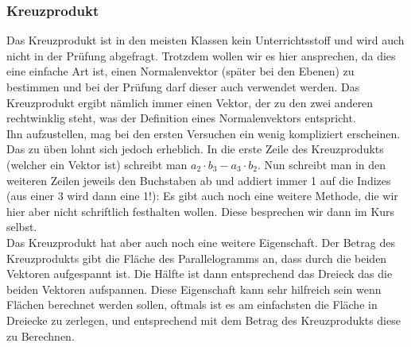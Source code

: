 	\subsubsection{Kreuzprodukt}
		Das Kreuzprodukt ist in den meisten Klassen kein Unterrichtsstoff und wird
		auch nicht in der Prüfung abgefragt. Trotzdem wollen wir es hier ansprechen,
		da dies eine einfache Art ist, einen Normalenvektor (später bei den Ebenen) zu
		bestimmen und bei der Prüfung darf dieser auch verwendet werden. Das
		Kreuzprodukt ergibt nämlich immer einen Vektor, der zu den zwei anderen
		rechtwinklig steht, was der Definition eines Normalenvektors entspricht.\\
		Ihn aufzustellen, mag bei den ersten Versuchen ein wenig kompliziert
		erscheinen. Das zu üben lohnt sich jedoch erheblich. In die erste Zeile des
		Kreuzprodukts (welcher ein Vektor ist) schreibt man \(a_2\cdot b_3-a_3\cdot
		b_2\). Nun schreibt man in den weiteren Zeilen jeweils den Buchstaben ab und
		addiert immer 1 auf die Indizes (aus einer 3 wird dann eine 1!):
		\formel{
			\[\vec{a} \times \vec{b}=
			\begin{pmatrix}
			 a_2b_3-a_3b_2\\
			 a_3b_1-a_1b_3\\
			 a_1b_2-a_2b_1
			\end{pmatrix}\]
		}
		Es gibt auch noch eine weitere Methode, die wir hier aber nicht schriftlich
		festhalten wollen. Diese besprechen wir dann im Kurs selbst.\\
		Das Kreuzprodukt hat aber auch noch eine weitere Eigenschaft. Der Betrag des
		Kreuzprodukts gibt die Fläche des Parallelogramms an, dass durch die beiden
		Vektoren aufgespannt ist. Die Hälfte ist dann entsprechend das Dreieck das die
		beiden Vektoren aufspannen. Diese Eigenschaft kann sehr hilfreich sein wenn
		Flächen berechnet werden sollen, oftmals ist es am einfachsten die Fläche in
		Dreiecke zu zerlegen, und entsprechend mit dem Betrag des Kreuzprodukts diese
		zu Berechnen.
		

